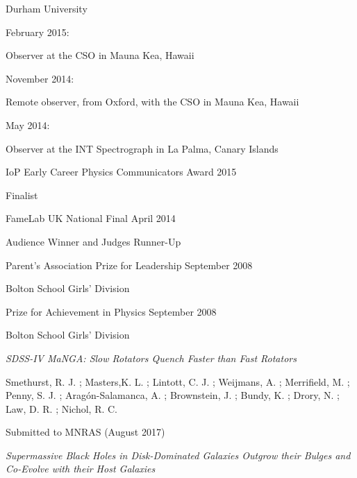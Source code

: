 \documentclass{article}
\begin{document}
\indent\indent\indent Durham University

\noindent\makebox[\linewidth]{\rule{0.8\paperwidth}{0.2pt}}


\indent February 2015:

\indent \indent Observer at the CSO in Mauna Kea, Hawaii

\smallskip

\indent November 2014:

\indent \indent Remote observer, from Oxford, with the CSO in Mauna Kea, Hawaii

\smallskip

\indent May 2014:

\indent \indent Observer at the INT Spectrograph in La Palma, Canary Islands

\noindent\makebox[\linewidth]{\rule{0.8\paperwidth}{0.2pt}}


\indent IoP Early Career Physics Communicators Award 2015

\indent \indent Finalist

\smallskip

\indent FameLab UK National Final April 2014

\indent \indent Audience Winner and Judges Runner-Up
\smallskip

\indent Parent's Association Prize for Leadership September 2008

\indent \indent Bolton School Girls' Division
\smallskip

\indent Prize for Achievement in Physics September 2008

\indent \indent Bolton School Girls' Division

\noindent\makebox[\linewidth]{\rule{0.8\paperwidth}{0.2pt}}



\hangindent=15pt \indent \emph{SDSS-IV MaNGA: Slow Rotators Quench Faster than Fast Rotators}

\hangindent=30pt \indent \indent Smethurst, R. J. ; Masters,K. L. ; Lintott, C. J. ; Weijmans, A. ; Merrifield, M. ; Penny, S. J. ;  Arag\'on-Salamanca, A. ; Brownstein, J. ; Bundy, K. ; Drory, N. ; Law, D. R. ; Nichol, R. C. 

\indent \indent Submitted to MNRAS (August 2017)

\medskip

\hangindent=15pt \indent \emph{Supermassive Black Holes in Disk-Dominated Galaxies Outgrow their Bulges and Co-Evolve with their Host Galaxies}
\end{document}
